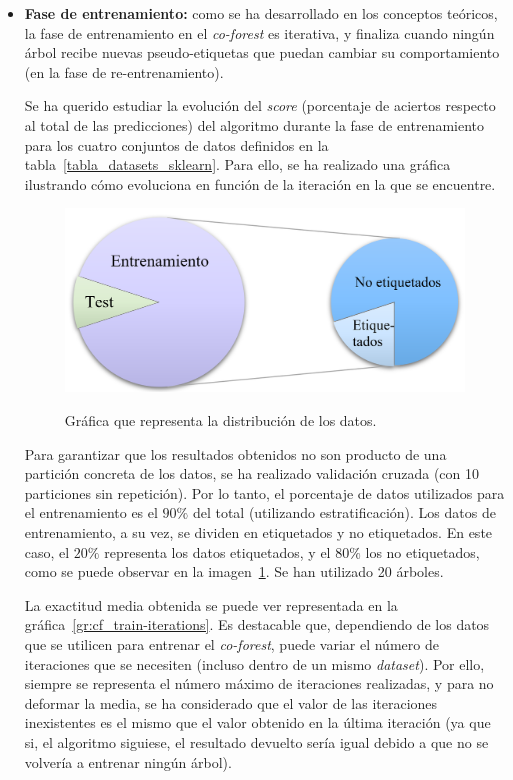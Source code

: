\begin{itemize}
	\item \textbf{Fase de entrenamiento:} como se ha desarrollado en los conceptos teóricos, la fase de entrenamiento en el \textit{co-forest} es iterativa, y finaliza cuando ningún árbol recibe nuevas pseudo-etiquetas que puedan cambiar su comportamiento (en la fase de re-entrenamiento).
	
	Se ha querido estudiar la evolución del \textit{score} (porcentaje de aciertos respecto al total de las predicciones) del algoritmo durante la fase de entrenamiento para los cuatro conjuntos de datos definidos en la tabla~\ref{tabla_datasets_sklearn}. Para ello, se ha realizado una gráfica ilustrando cómo evoluciona en función de la iteración en la que se encuentre.
	
	\begin{figure}[h]
		\caption[\textit{Co-Forest}: Distribución de datos entrenamiento y \textit{test}]{Gráfica que representa la distribución de los datos.}
		\centering
		\includegraphics[scale=0.3]{../img/memoria/5_entrenamiento_particiones}
		\label{5_entrenamiento_particiones}
	\end{figure}

	Para garantizar que los resultados obtenidos no son producto de una partición concreta de los datos, se ha realizado validación cruzada (con 10 particiones sin repetición). Por lo tanto, el porcentaje de datos utilizados para el entrenamiento es el $90\%$ del total (utilizando estratificación). Los datos de entrenamiento, a su vez, se dividen en etiquetados y no etiquetados. En este caso, el $20\%$ representa los datos etiquetados, y el $80\%$ los no etiquetados, como se puede observar en la imagen~\ref{5_entrenamiento_particiones}. Se han utilizado 20 árboles.
	
	La exactitud media obtenida se puede ver representada en la gráfica~\ref{gr:cf_train-iterations}. Es destacable que, dependiendo de los datos que se utilicen para entrenar el \textit{co-forest}, puede variar el número de iteraciones que se necesiten (incluso dentro de un mismo \textit{dataset}). Por ello, siempre se representa el número máximo de iteraciones realizadas, y para no deformar la media, se ha considerado que el valor de las iteraciones inexistentes es el mismo que el valor obtenido en la última iteración (ya que si, el algoritmo siguiese, el resultado devuelto sería igual debido a que no se volvería a entrenar ningún árbol).
	

\end{itemize}
